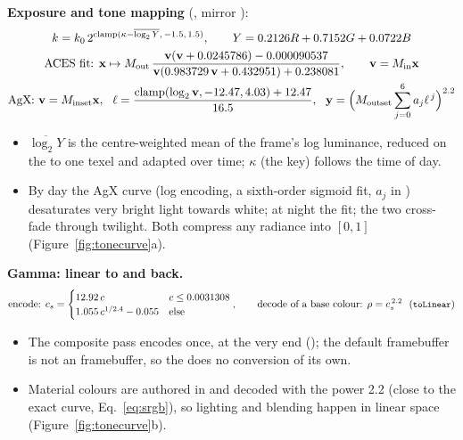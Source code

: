 \textbf{Exposure and tone mapping} (,  mirror ):
\begin{gather}
k=k_0\,2^{\operatorname{clamp}(\kappa-\overline{\log_2 Y},\,-1.5,\,1.5)},\qquad Y=0.2126R+0.7152G+0.0722B\label{eq:tonemap}\\
\text{ACES fit: } \vect x\mapsto M_{\text{out}}\,\frac{\vect v(\vect v+0.0245786)-0.000090537}{\vect v(0.983729\,\vect v+0.432951)+0.238081},\qquad \vect v=M_{\text{in}}\vect x\nonumber\\
\text{AgX: } \vect v=M_{\text{inset}}\vect x,\ \ \ell=\frac{\operatorname{clamp}(\log_2\vect v,-12.47,4.03)+12.47}{16.5},\ \ 
\vect y=\Big(M_{\text{outset}}\sum_{j=0}^{6}a_j\ell^{\,j}\Big)^{2.2}\nonumber
\end{gather}
\begin{itemize}
\item $\overline{\log_2Y}$ is the centre-weighted mean of the frame's log luminance, reduced on the  to one texel and
adapted over time; $\kappa$ (the key) follows the time of day.
\item By day the AgX curve (log encoding, a sixth-order sigmoid fit, $a_j$ in ) desaturates very bright
light towards white; at night the \ab{552}{ACES} fit; the two cross-fade through twilight. Both compress any radiance into $[0,1]$
(Figure~\ref{fig:tonecurve}a).
\end{itemize}

\textbf{Gamma: linear to  and back.}
\begin{equation}
\text{encode: } c_s=\begin{cases}12.92\,c & c\le0.0031308\\ 1.055\,c^{1/2.4}-0.055 & \text{else}\end{cases},\qquad
\text{decode of a base colour: } \rho=c_s^{\,2.2}\ \ (\code{toLinear})\label{eq:gamma}
\end{equation}
\begin{itemize}
\item The composite pass encodes once, at the very end (); the default framebuffer is not an 
framebuffer, so the \ab{555}{GPU} does no conversion of its own.
\item Material colours are authored in \ab{556}{sRGB} and decoded with the power 2.2 (close to the exact  curve, Eq.~\eqref{eq:srgb}),
so lighting and blending happen in linear space (Figure~\ref{fig:tonecurve}b).
\end{itemize}

